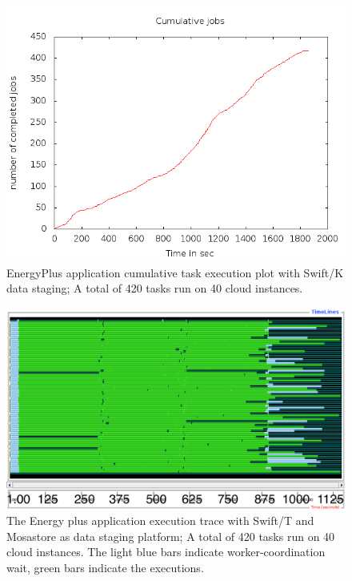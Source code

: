 \documentclass[10pt,journal,cspaper,compsoc]{IEEEtran}
\begin{document}
\begin{figure}[htb]
\begin{center}
\includegraphics[width=\linewidth]{plots/eplus_40i_80c.png}
\caption{EnergyPlus application cumulative task execution plot with
Swift/K data staging; A total of 420 tasks run on 40 cloud instances. 
\label{fig_eplus_k}
}
\end{center}
\end{figure}

\begin{figure}[htb]
\begin{center}
\includegraphics[width=\linewidth]{plots/eplus_timeline_40i_80c.png}
\caption{The Energy plus application execution trace with Swift/T and Mosastore
as data staging platform; A total of 420 tasks run on 40 cloud instances.
The light blue bars indicate worker-coordination wait, green bars
indicate the executions.
\label{fig_eplus_t}
}
\end{center}
\end{figure}
\end{document}
